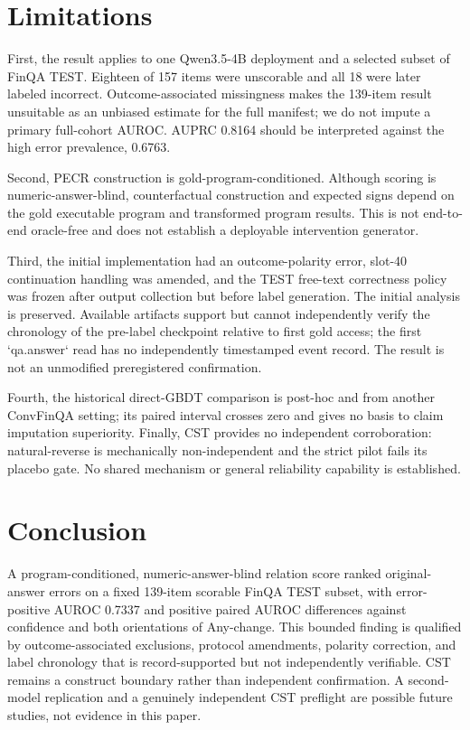 \documentclass[11pt]{article}
\begin{document}
\section{Limitations}
First, the result applies to one Qwen3.5-4B deployment and a selected subset of FinQA TEST. Eighteen of 157 items were unscorable and all 18 were later labeled incorrect. Outcome-associated missingness makes the 139-item result unsuitable as an unbiased estimate for the full manifest; we do not impute a primary full-cohort AUROC. AUPRC 0.8164 should be interpreted against the high error prevalence, 0.6763.

Second, PECR construction is gold-program-conditioned. Although scoring is numeric-answer-blind, counterfactual construction and expected signs depend on the gold executable program and transformed program results. This is not end-to-end oracle-free and does not establish a deployable intervention generator.

Third, the initial implementation had an outcome-polarity error, slot-40 continuation handling was amended, and the TEST free-text correctness policy was frozen after output collection but before label generation. The initial analysis is preserved. Available artifacts support but cannot independently verify the chronology of the pre-label checkpoint relative to first gold access; the first `qa.answer` read has no independently timestamped event record. The result is not an unmodified preregistered confirmation.

Fourth, the historical direct-GBDT comparison is post-hoc and from another ConvFinQA setting; its paired interval crosses zero and gives no basis to claim imputation superiority. Finally, CST provides no independent corroboration: natural-reverse is mechanically non-independent and the strict pilot fails its placebo gate. No shared mechanism or general reliability capability is established.

\section{Conclusion}
A program-conditioned, numeric-answer-blind relation score ranked original-answer errors on a fixed 139-item scorable FinQA TEST subset, with error-positive AUROC 0.7337 and positive paired AUROC differences against confidence and both orientations of Any-change. This bounded finding is qualified by outcome-associated exclusions, protocol amendments, polarity correction, and label chronology that is record-supported but not independently verifiable. CST remains a construct boundary rather than independent confirmation. A second-model replication and a genuinely independent CST preflight are possible future studies, not evidence in this paper.



\end{document}
